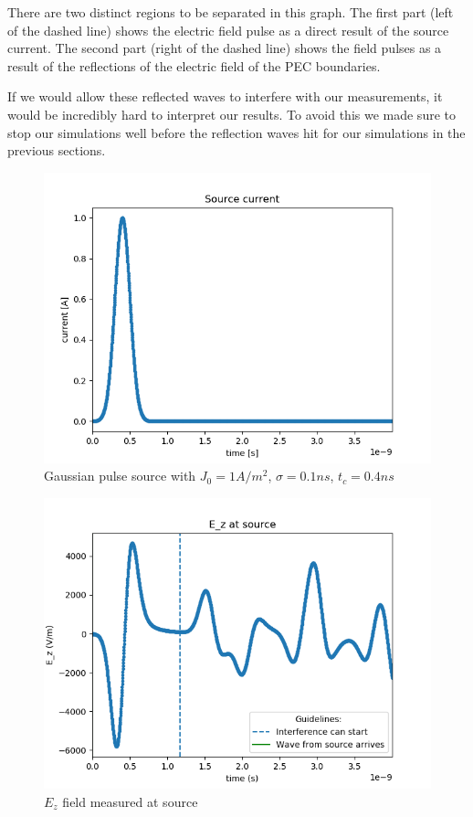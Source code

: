 \documentclass[11pt, a4paper]{article}
\begin{document}
There are two distinct regions to be separated in this graph. The first part (left of the dashed line) shows the electric field pulse as a direct result of the source current. The second part (right of the dashed line) shows the field pulses as a result of the reflections of the electric field of the PEC boundaries.

If we would allow these reflected waves to interfere with our measurements, it would be incredibly hard to interpret our results. To avoid this we made sure to stop our simulations well before the reflection waves hit for our simulations in the previous sections.

\begin{figure}[H]
\centering
\includegraphics[width=0.75\linewidth]{PEC/PEC_current.png}
\caption{Gaussian pulse source with $J_0=1 A/m^2$, $\sigma=0.1 ns$, $t_c = 0.4 ns$}
\label{PEC_reflection_source}
\end{figure}

\begin{figure}[H]
\centering
\includegraphics[width=0.75\linewidth]{PEC/PEC_E_z.png}
\caption{$E_z$ field measured at source}
\label{PEC_reflection_field}
\end{figure}
\end{document}
